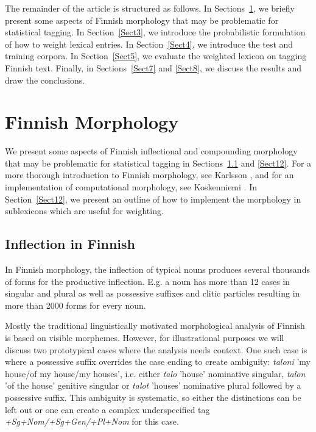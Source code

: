 \documentclass[postprint]{flammie}
\begin{document}
The remainder of the article is structured as follows. In
Sections~\ref{Sect1}, we briefly present some aspects of Finnish
morphology that may be problematic for statistical tagging. In
Section~\ref{Sect3}, we introduce the probabilistic formulation of how
to weight lexical entries. In Section~\ref{Sect4}, we introduce the
test and training corpora. In Section~\ref{Sect5}, we evaluate the
weighted lexicon on tagging Finnish text. Finally, in
Sections~\ref{Sect7} and \ref{Sect8}, we discuss the results and draw
the conclusions.

\section{Finnish Morphology}
\label{Sect1}

We present some aspects of Finnish inflectional and compounding
morphology that may be problematic for statistical tagging in
Sections~\ref{Sect11} and \ref{Sect12}. For a more thorough
introduction to Finnish morphology, see Karlsson \cite{karlsson1999},
and for an implementation of computational morphology, see Koskenniemi
\cite{koskenniemi1983}. In Section~\ref{Sect12}, we present an outline
of how to implement the morphology in sublexicons which are useful for
weighting.
 
\subsection{Inflection in Finnish}
\label{Sect11}

In Finnish morphology, the inflection of typical nouns produces
several thousands of forms for the productive inflection. E.g. a noun
has more than 12 cases in singular and plural as well as possessive
suffixes and clitic particles resulting in more than 2000 forms for
every noun. 

Mostly the traditional linguistically motivated morphological analysis
of Finn\-ish is based on visible morphemes. However, for illustrational
purposes we will discuss two prototypical cases where the analysis
needs context. One such case is where a possessive suffix overrides
the case ending to create ambiguity: {\em taloni} 'my house/of my
house/my houses', i.e. either {\em talo} 'house' nominative singular,
{\em talon} 'of the house' genitive singular or {\em talot} 'houses'
nominative plural followed by a possessive suffix. This ambiguity is
systematic, so either the distinctions can be left out or one can
create a complex underspecified tag {\em +Sg+Nom/\-+Sg+Gen/\-+Pl+Nom} for
this case.
\end{document}
